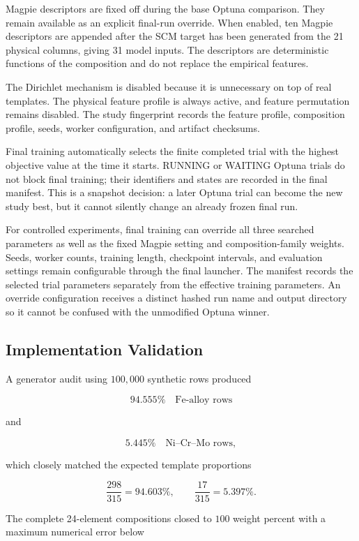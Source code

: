 \documentclass{article}
\begin{document}
Magpie descriptors are fixed off during the base Optuna comparison. They remain
available as an explicit final-run override. When enabled, ten Magpie
descriptors are appended after the SCM target has been generated from the 21
physical columns, giving 31 model inputs. The descriptors are deterministic
functions of the composition and do not replace the empirical features.

The Dirichlet mechanism is disabled because it is unnecessary on top of real
templates. The physical feature profile is always active, and feature
permutation remains disabled. The study fingerprint records the feature
profile, composition profile, seeds, worker configuration, and artifact
checksums.

Final training automatically selects the finite completed trial with the
highest objective value at the time it starts. RUNNING or WAITING Optuna trials
do not block final training; their identifiers and states are recorded in the
final manifest. This is a snapshot decision: a later Optuna trial can become
the new study best, but it cannot silently change an already frozen final run.

For controlled experiments, final training can override all three searched
parameters as well as the fixed Magpie setting and composition-family weights.
Seeds, worker counts, training length, checkpoint intervals, and evaluation
settings remain configurable through the final launcher. The manifest records
the selected trial parameters separately from the effective training
parameters. An override configuration receives a distinct hashed run name and
output directory so it cannot be confused with the unmodified Optuna winner.

\subsection{Implementation Validation}

A generator audit using \(100{,}000\) synthetic rows produced

\[
94.555\%
\quad\text{Fe-alloy rows}
\]

and

\[
5.445\%
\quad\text{Ni--Cr--Mo rows},
\]

which closely matched the expected template proportions

\[
\frac{298}{315}
=
94.603\%,
\qquad
\frac{17}{315}
=
5.397\%.
\]

The complete 24-element compositions closed to \(100\) weight percent with a
maximum numerical error below
\end{document}
